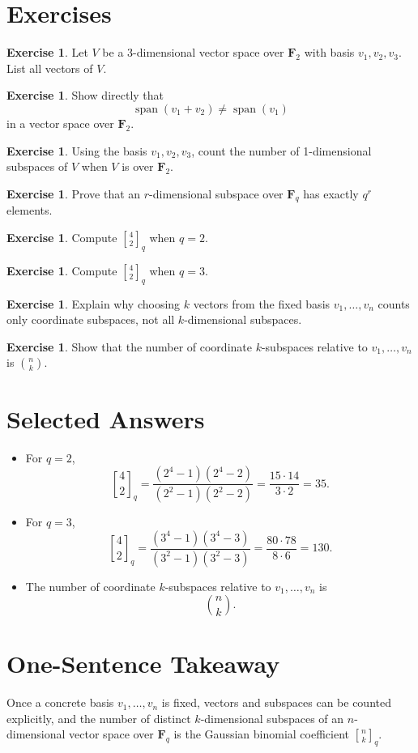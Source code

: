 \documentclass[11pt]{article}
\theoremstyle{definition}
\newtheorem{exercise}[theorem]{Exercise}
\theoremstyle{remark}
\newcommand{\F}{\mathbf{F}}
\newcommand{\Span}{\operatorname{span}}
\newcommand{\qbinom}[2]{\genfrac{[}{]}{0pt}{}{#1}{#2}_q}
\begin{document}
	\section{Exercises}
	
	\begin{exercise}
		Let \(V\) be a 3-dimensional vector space over \(\F_2\) with basis \(v_1,v_2,v_3\). List all vectors of \(V\).
	\end{exercise}
	
	\begin{exercise}
		Show directly that
		\[
		\Span(v_1+v_2)\neq \Span(v_1)
		\]
		in a vector space over \(\F_2\).
	\end{exercise}
	
	\begin{exercise}
		Using the basis \(v_1,v_2,v_3\), count the number of 1-dimensional subspaces of \(V\) when \(V\) is over \(\F_2\).
	\end{exercise}
	
	\begin{exercise}
		Prove that an \(r\)-dimensional subspace over \(\F_q\) has exactly \(q^r\) elements.
	\end{exercise}
	
	\begin{exercise}
		Compute \(\qbinom{4}{2}\) when \(q=2\).
	\end{exercise}
	
	\begin{exercise}
		Compute \(\qbinom{4}{2}\) when \(q=3\).
	\end{exercise}
	
	\begin{exercise}
		Explain why choosing \(k\) vectors from the fixed basis \(v_1,\dots,v_n\) counts only coordinate subspaces, not all \(k\)-dimensional subspaces.
	\end{exercise}
	
	\begin{exercise}
		Show that the number of coordinate \(k\)-subspaces relative to \(v_1,\dots,v_n\) is \(\binom{n}{k}\).
	\end{exercise}
	
	\section{Selected Answers}
	
	\begin{itemize}
		\item For \(q=2\),
		\[
		\qbinom{4}{2}
		=
		\frac{(2^4-1)(2^4-2)}{(2^2-1)(2^2-2)}
		=
		\frac{15\cdot 14}{3\cdot 2}
		=
		35.
		\]
		
		\item For \(q=3\),
		\[
		\qbinom{4}{2}
		=
		\frac{(3^4-1)(3^4-3)}{(3^2-1)(3^2-3)}
		=
		\frac{80\cdot 78}{8\cdot 6}
		=
		130.
		\]
		
		\item The number of coordinate \(k\)-subspaces relative to \(v_1,\dots,v_n\) is
		\[
		\binom{n}{k}.
		\]
	\end{itemize}
	
	\section*{One-Sentence Takeaway}
	
	Once a concrete basis \(v_1,\dots,v_n\) is fixed, vectors and subspaces can be counted explicitly, and the number of distinct \(k\)-dimensional subspaces of an \(n\)-dimensional vector space over \(\F_q\) is the Gaussian binomial coefficient \(\qbinom{n}{k}\).
	
\end{document}
